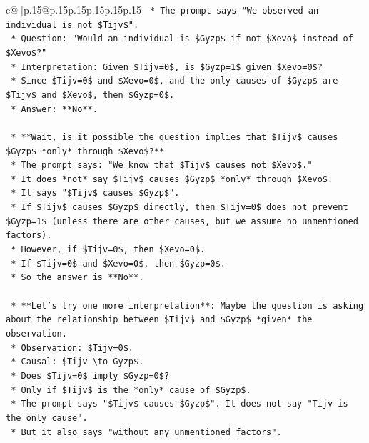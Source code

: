 \documentclass{article}
\begin{document}
{\begin{supertabular}{c@{$\;$}|p{.15\linewidth}@{}p{.15\linewidth}p{.15\linewidth}p{.15\linewidth}p{.15\linewidth}p{.15\linewidth}}
{{{\texttt{        *   The prompt says "We observed an individual is not \$Tijv\$".} \\
\texttt{        *   Question: "Would an individual is \$Gyzp\$ if not \$Xevo\$ instead of \$Xevo\$?"} \\
\texttt{        *   Interpretation: Given \$Tijv=0\$, is \$Gyzp=1\$ given \$Xevo=0\$?} \\
\texttt{        *   Since \$Tijv=0\$ and \$Xevo=0\$, and the only causes of \$Gyzp\$ are \$Tijv\$ and \$Xevo\$, then \$Gyzp=0\$.} \\
\texttt{        *   Answer: **No**.} \\
\\ 
\texttt{    *   **Wait, is it possible the question implies that \$Tijv\$ causes \$Gyzp\$ *only* through \$Xevo\$?**} \\
\texttt{        *   The prompt says: "We know that \$Tijv\$ causes not \$Xevo\$."} \\
\texttt{        *   It does *not* say \$Tijv\$ causes \$Gyzp\$ *only* through \$Xevo\$.} \\
\texttt{        *   It says "\$Tijv\$ causes \$Gyzp\$".} \\
\texttt{        *   If \$Tijv\$ causes \$Gyzp\$ directly, then \$Tijv=0\$ does not prevent \$Gyzp=1\$ (unless there are other causes, but we assume no unmentioned factors).} \\
\texttt{        *   However, if \$Tijv=0\$, then \$Xevo=0\$.} \\
\texttt{        *   If \$Tijv=0\$ and \$Xevo=0\$, then \$Gyzp=0\$.} \\
\texttt{        *   So the answer is **No**.} \\
\\ 
\texttt{    *   **Let's try one more interpretation**: Maybe the question is asking about the relationship between \$Tijv\$ and \$Gyzp\$ *given* the observation.} \\
\texttt{        *   Observation: \$Tijv=0\$.} \\
\texttt{        *   Causal: \$Tijv \textbackslash{}to Gyzp\$.} \\
\texttt{        *   Does \$Tijv=0\$ imply \$Gyzp=0\$?} \\
\texttt{        *   Only if \$Tijv\$ is the *only* cause of \$Gyzp\$.} \\
\texttt{        *   The prompt says "\$Tijv\$ causes \$Gyzp\$". It does not say "Tijv is the only cause".} \\
\texttt{        *   But it also says "without any unmentioned factors".} \\
}}}
\end{supertabular}}
\end{document}
